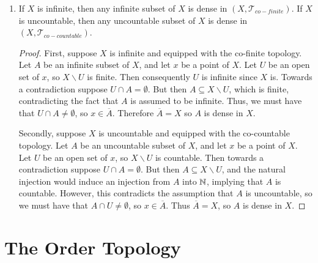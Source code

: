 \documentclass[12pt, a4paper, oneside, openright, titlepage]{book}
\begin{document}
\begin{eg}
\begin{enumerate}
\begin{proof}
                Conversely, suppose $p \in A$. Then let $x$ be a point of $X$ and $U$ an open set containing $x$. Then by definition of open sets in the particular point topology, $p \in U$, so $p \in U \cap A \neq \emptyset$. Thus by definition $x \in \overline{A}$, so we conclude that $\overline{A} = X$.
        \end{proof}
        \item If $X$ is infinite, then any infinite subset of $X$ is dense in $(X,\mathcal{T}_{co-finite})$. If $X$ is uncountable, then any uncountable subset of $X$ is dense in $(X,\mathcal{T}_{co-countable})$.
            \begin{proof}
                First, suppose $X$ is infinite and equipped with the co-finite topology. Let $A$ be an infinite subset of $X$, and let $x$ be a point of $X$. Let $U$ be an open set of $x$, so $X\backslash U$ is finite. Then consequently $U$ is infinite since $X$ is. Towards a contradiction suppose $U\cap A = \emptyset$. But then $A \subseteq X\backslash U$, which is finite, contradicting the fact that $A$ is assumed to be infinite. Thus, we must have that $U\cap A \neq \emptyset$, so $x \in \overline{A}$. Therefore $\overline{A} = X$ so $A$ is dense in $X$.
                

                Secondly, suppose $X$ is uncountable and equipped with the co-countable topology. Let $A$ be an uncountable subset of $X$, and let $x$ be a point of $X$. Let $U$ be an open set of $x$, so $X\backslash U$ is countable. Then towards a contradiction suppose $U\cap A = \emptyset$. But then $A \subseteq X\backslash U$, and the natural injection would induce an injection from $A$ into $\mathbb N$, implying that $A$ is countable. However, this contradicts the assumption that $A$ is uncountable, so we must have that $A\cap U \neq \emptyset$, so $x \in \overline{A}$. Thus $\overline{A} = X$, so $A$ is dense in $X$.
            \end{proof}
    \end{enumerate}
\end{eg}




\section{The Order Topology}
\end{document}
